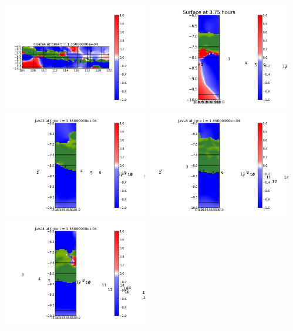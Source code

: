 \documentclass[11pt]{article}
\begin{document}
\vskip 10pt 
\includegraphics[width=0.475\textwidth]{frame0015fig0.png}
\includegraphics[width=0.475\textwidth]{frame0015fig15.png}
\vskip 10pt 
\includegraphics[width=0.475\textwidth]{frame0015fig25.png}
\includegraphics[width=0.475\textwidth]{frame0015fig20.png}
\vskip 10pt 
\includegraphics[width=0.475\textwidth]{frame0015fig30.png}
\end{document}
